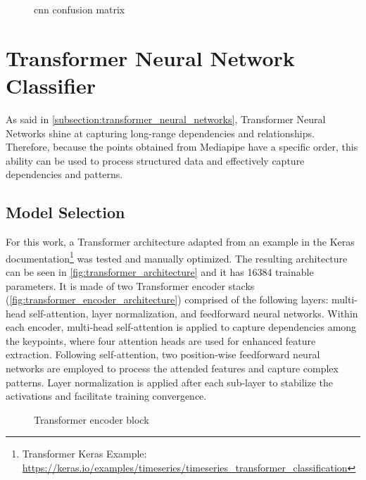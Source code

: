 \begin{figure}[ht]
    \centering
    {\fontsize{10}{12}\selectfont}
    \caption{\acs{cnn} confusion matrix}
    \label{fig:cnn_dataset2_confusion_matrix}
\end{figure}

\section{Transformer Neural Network Classifier}
\label{section:transformer_classifier}

As said in \autoref{subsection:transformer_neural_networks}, Transformer Neural Networks shine at capturing long-range dependencies and relationships. Therefore, because the points obtained from Mediapipe have a specific order, this ability can be used to process structured data and effectively capture dependencies and patterns.

\subsection{Model Selection}

For this work, a Transformer architecture adapted from an example in the Keras documentation\footnote{Transformer Keras Example: \url{https://keras.io/examples/timeseries/timeseries_transformer_classification}} was tested and manually optimized. The resulting architecture can be seen in \autoref{fig:transformer_architecture} and it has \num{16384} trainable parameters. It is made of two Transformer encoder stacks (\autoref{fig:transformer_encoder_architecture}) comprised of the following layers: multi-head self-attention, layer normalization, and feedforward neural networks. Within each encoder, multi-head self-attention is applied to capture dependencies among the keypoints, where four attention heads are used for enhanced feature extraction. Following self-attention, two position-wise feedforward neural networks are employed to process the attended features and capture complex patterns. Layer normalization is applied after each sub-layer to stabilize the activations and facilitate training convergence. 

\begin{figure}[ht]
    \centering
    {\fontsize{10}{12}\selectfont}
    \caption{Transformer encoder block}
    \label{fig:transformer_encoder_architecture}
\end{figure}


